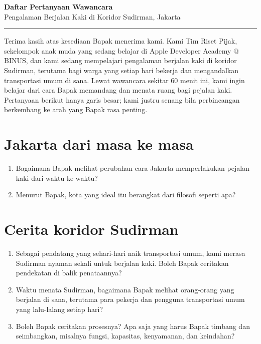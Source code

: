 \documentclass[11pt,a4paper]{article}
\begin{document}
\begin{center}
  {\large\bfseries Daftar Pertanyaan Wawancara}\\[3pt]
  {\normalsize Pengalaman Berjalan Kaki di Koridor Sudirman, Jakarta}\\[8pt]
  \rule{\textwidth}{0.6pt}
\end{center}

\vspace{6pt}

Terima kasih atas kesediaan Bapak menerima kami. Kami Tim Riset Pijak, sekelompok anak muda yang
sedang belajar di Apple Developer Academy @ BINUS, dan kami sedang mempelajari pengalaman berjalan
kaki di koridor Sudirman, terutama bagi warga yang setiap hari bekerja dan mengandalkan
transportasi umum di sana. Lewat wawancara sekitar 60 menit ini, kami ingin belajar dari cara
Bapak memandang dan menata ruang bagi pejalan kaki. Pertanyaan berikut hanya garis besar; kami
justru senang bila perbincangan berkembang ke arah yang Bapak rasa penting.

\section*{Jakarta dari masa ke masa}
\begin{enumerate}
  \item Bagaimana Bapak melihat perubahan cara Jakarta memperlakukan pejalan kaki dari waktu ke
        waktu?
  \item Menurut Bapak, kota yang ideal itu berangkat dari filosofi seperti apa?
\end{enumerate}

\section*{Cerita koridor Sudirman}
\begin{enumerate}[start=3]
  \item Sebagai pendatang yang sehari-hari naik transportasi umum, kami merasa Sudirman nyaman
        sekali untuk berjalan kaki. Boleh Bapak ceritakan pendekatan di balik penataannya?
  \item Waktu menata Sudirman, bagaimana Bapak melihat orang-orang yang berjalan di sana, terutama
        para pekerja dan pengguna transportasi umum yang lalu-lalang setiap hari?
  \item Boleh Bapak ceritakan prosesnya? Apa saja yang harus Bapak timbang dan seimbangkan,
        misalnya fungsi, kapasitas, kenyamanan, dan keindahan?
\end{enumerate}
\end{document}
